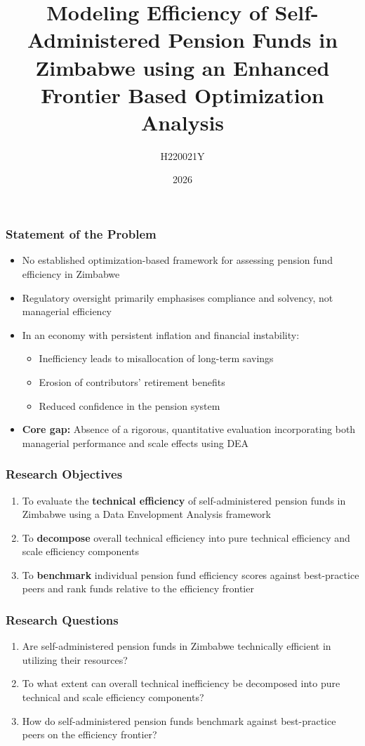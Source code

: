 \documentclass{beamer}
\title{Modeling Efficiency of Self-Administered Pension Funds in Zimbabwe using an Enhanced Frontier Based Optimization Analysis}
\author{H220021Y}
\institute{Harare Institute of Technology}
\date{2026}
\begin{document}
\frame{\titlepage}


\begin{frame}
    \frametitle{Statement of the Problem}
    \begin{itemize}
        \item No established optimization-based framework for assessing pension fund efficiency in Zimbabwe
        \item Regulatory oversight primarily emphasises compliance and solvency, not managerial efficiency
        \item In an economy with persistent inflation and financial instability:
        \begin{itemize}
            \item Inefficiency leads to misallocation of long-term savings
            \item Erosion of contributors' retirement benefits
            \item Reduced confidence in the pension system
        \end{itemize}
        \item \textbf{Core gap:} Absence of a rigorous, quantitative evaluation incorporating both managerial performance and scale effects using DEA
    \end{itemize}
\end{frame}

\begin{frame}
    \frametitle{Research Objectives}
    \begin{enumerate}
        \item To evaluate the \textbf{technical efficiency} of self-administered pension funds in Zimbabwe using a Data Envelopment Analysis framework
        \item To \textbf{decompose} overall technical efficiency into pure technical efficiency and scale efficiency components
        \item To \textbf{benchmark} individual pension fund efficiency scores against best-practice peers and rank funds relative to the efficiency frontier
    \end{enumerate}
\end{frame}

\begin{frame}
    \frametitle{Research Questions}
    \begin{enumerate}
        \item Are self-administered pension funds in Zimbabwe technically efficient in utilizing their resources?
        \item To what extent can overall technical inefficiency be decomposed into pure technical and scale efficiency components?
        \item How do self-administered pension funds benchmark against best-practice peers on the efficiency frontier?
    \end{enumerate}
\end{frame}
\end{document}
